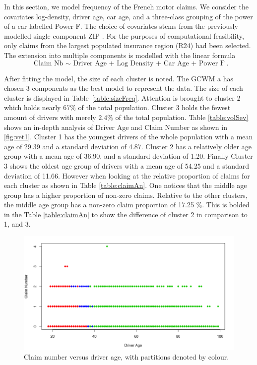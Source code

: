 \documentclass[11pt,letterpaper]{article}
\numberwithin{equation}{section}
\numberwithin{equation}{section}
\numberwithin{equation}{section}
\begin{document}
In this section, we model frequency of the French motor claims. We consider the covariates log-density, driver age, car age, and a three-class grouping of the power of a car labelled Power F. The choice of covariates stems from the previously modelled single component ZIP \citep{Charpentier:2014}. For the purposes of computational feasibility, only claims from the largest populated insurance region (R24) had been selected. %
The extension into multiple components is modelled with the linear formula
$$ \text{ Claim Nb $\sim$  Driver Age + Log Density + Car Age + Power F}. $$%

After fitting the model, the size of each cluster is noted. The GCWM a has chosen 3 components as the best model to represent the data. The size of each cluster is displayed in Table~\ref{table:sizeFreq}. %
Attention is brought %
to cluster 2 which holds nearly $67 \%$ of the total population. Cluster 3 holds the fewest amount of drivers with merely $2.4 \% $ of the total population. Table \ref{table:volSev} shows an in-depth analysis of Driver Age and Claim Number as shown in \ref{fig:vet1}.  Cluster 1 has the youngest drivers of the whole population with a mean age of 29.39 and a standard deviation of 4.87. Cluster 2 has a relatively older age group with a mean age of 36.90, and a standard deviation of 1.20. Finally Cluster 3 shows the oldest age group of drivers with a mean age of 54.25 and a standard deviation of 11.66. However when looking at the relative proportion of claims for each cluster as shown in Table \ref{table:claimAn}. One notices that the middle age group has a higher proportion of non-zero claims. Relative to the other clusters, the middle age group has a non-zero claim proportion of 17.25 \%. This is bolded in the Table \ref{table:claimAn} to show the difference of cluster 2 in comparison to 1, and 3.
\begin{figure}[!htb]
\label{figure:3}
\begin{center}
\includegraphics[scale=0.25]{driverVClaimNumber.png}
\end{center}
\caption{Claim number versus driver age, with partitions denoted by colour.}
\end{figure}
\end{document}

